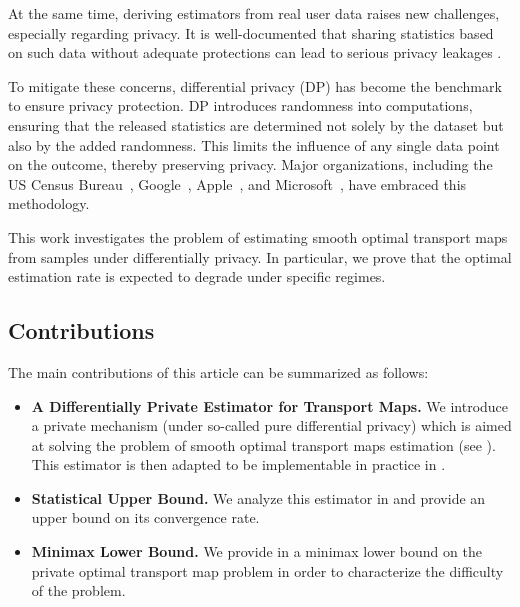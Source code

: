 \documentclass{article}
\theoremstyle{plain}
\theoremstyle{definition}
\theoremstyle{remark}
\begin{document}
At the same time, deriving estimators from real user data raises new challenges, especially regarding privacy. 
It is well-documented that sharing statistics based on such data without adequate protections can lead to serious privacy leakages \cite{narayanan2006break,backstrom2007wherefore,fredrikson2015model,dinur2003revealing,homer2008resolving,loukides2010disclosure,narayanan2008robust,sweeney2000simple,wagner2018technical,sweeney2002k}.

To mitigate these concerns, differential privacy (DP) \cite{dwork2006calibrating} has become the benchmark to ensure privacy protection. 
DP introduces randomness into computations, ensuring that the released statistics are determined not solely by the dataset but also by the added randomness. 
This limits the influence of any single data point on the outcome, thereby preserving privacy. 
Major organizations, including the US Census Bureau~\citep{abowd2018us}, Google~\citep{erlingsson2014rappor}, Apple~\citep{thakurta2017learning}, and Microsoft~\citep{ding2017collecting}, have embraced this methodology.

This work investigates the problem of estimating smooth optimal transport maps from samples under differentially privacy. In particular, we prove that the optimal estimation rate is expected to degrade under specific regimes.

\subsection{Contributions}

The main contributions of this article can be summarized as follows:
\begin{itemize}
    \item  \textbf{A Differentially Private Estimator for Transport Maps.} We introduce a private mechanism (under so-called pure differential privacy) which is aimed at solving the problem of smooth optimal transport maps estimation (see ). This estimator is then adapted to be implementable in practice in .
    \item \textbf{Statistical Upper Bound.}  We analyze this estimator in   and provide an upper bound on its convergence rate.
    \item \textbf{Minimax Lower Bound.} We provide in  a minimax lower bound on the private optimal transport map problem in order to characterize the difficulty of the problem.
\end{itemize}
\end{document}
